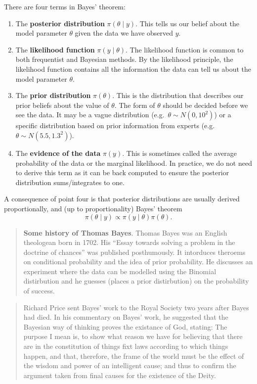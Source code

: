 \documentclass[
]{book}
\providecommand{\tightlist}{%
  \setlength{\itemsep}{0pt}\setlength{\parskip}{0pt}}
\theoremstyle{definition}
\theoremstyle{definition}
\theoremstyle{definition}
\theoremstyle{definition}
\theoremstyle{remark}
\begin{document}
There are four terms in Bayes' theorem:

\begin{enumerate}
\def\labelenumi{\arabic{enumi}.}
\tightlist
\item
  The \textbf{posterior distribution} \(\pi(\theta \mid y)\). This tells us our belief about the model parameter \(\theta\) given the data we have observed \(y\).
\item
  The \textbf{likelihood function} \(\pi(y \mid \theta)\). The likelihood function is common to both frequentist and Bayesian methods. By the likelihood principle, the likelihood function contains all the information the data can tell us about the model parameter \(\theta\).
\item
  The \textbf{prior distribution} \(\pi(\theta)\). This is the distribution that describes our prior beliefs about the value of \(\theta\). The form of \(\theta\) should be decided before we see the data. It may be a vague distribution (e.g.~\(\theta \sim N(0, 10^2)\)) or a specific distribution based on prior information from experts (e.g.~\(\theta \sim N(5.5, 1.3^2)\)).\\
\item
  The \textbf{evidence of the data} \(\pi(y)\). This is sometimes called the average probability of the data or the marginal likelihood. In practice, we do not need to derive this term as it can be back computed to ensure the posterior distribution sums/integrates to one.
\end{enumerate}

A consequence of point four is that posterior distributions are usually derived proportionally, and (up to proportionality) Bayes' theorem
\[
\pi(\theta \mid y) \propto \pi(y\mid\theta)\pi(\theta).
\]

\begin{quote}
\textbf{Some history of Thomas Bayes}. Thomas Bayes was an English theologean born in 1702. His ``Essay towards solving a problem in the doctrine of chances'' was published posthumously. It intorduces theroems on conditional probability and the idea of prior probability. He discusses an experiment where the data can be modelled using the Binomial distirbution and he guesses (places a prior distirbution) on the probability of success.
\end{quote}

\begin{quote}
Richard Price sent Bayes' work to the Royal Society two years after Bayes had died. In his commentary on Bayes' work, he suggested that the Bayesian way of thinking proves the existance of God, stating: The purpose I mean is, to show what reason we have for believing that there are in the constitution of things fixt laws according to which things happen, and that, therefore, the frame of the world must be the effect of the wisdom and power of an intelligent cause; and thus to confirm the argument taken from final causes for the existence of the Deity.
\end{quote}
\end{document}
